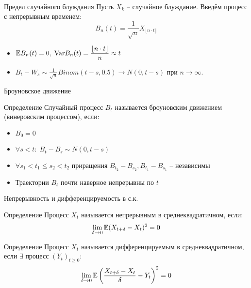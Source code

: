 \documentclass{beamer}
\begin{document}
\begin{frame}{Предел случайного блуждания}
    Пусть $X_k$ -- случайное блуждание. Введём процесс с непрерывным временем:
    $$
        B_{n}(t) = \frac{1}{\sqrt{n}} X_{\lfloor n \cdot t \rfloor}
    $$
    \begin{itemize}
        \item $\mathbb{E} B_n(t) = 0, \; \mathrm{Var} B_n(t) = \dfrac{\lfloor n \cdot t \rfloor}{n} \approx t$
        \item $B_t - W_s \sim \frac{1}{\sqrt{n}} Binom(t-s, 0.5) \to N(0, t-s)$ при $n\to\infty$.
    \end{itemize}
\end{frame}

\begin{frame}{Броуновское движение}
    \begin{block}{Определение}
        Случайный процесс $B_t$ называется броуновским движением (винеровским процессом), если:
        \begin{itemize}
            \item $B_0 = 0$
            \item $\forall s < t: \; B_t - B_s \sim N(0, t - s)$
            \item $\forall s_1 < t_1 \leq s_2 < t_2$ приращения
            $B_{t_2} - B_{s_2}, B_{t_1} - B_{s_1}$ -- независимы
            \item Траектории $B_t$ почти наверное непрерывны по $t$ 
        \end{itemize}
    \end{block}
\end{frame}
\begin{frame}{Непрерывность и дифференцируемость в с.к.}
    \begin{block}{Определение}
        Процесс $X_t$ называется непрерывным в среднеквадратичном, если:
        $$
            \lim_{\delta \to 0} \mathbb{E}(X_{t+\delta} - X_t)^2 = 0
        $$
    \end{block}
    \begin{block}{Определение}
        Процесс $X_t$ называется дифференцируемым в среднеквадратичном, если $\exists$ процесс $(Y_t)_{t\geq 0}$:
        $$
            \lim_{\delta \to 0} \mathbb{E} \left(\dfrac{X_{t+\delta} - X_t}{\delta} - Y_t\right)^2 = 0
        $$
    \end{block}
\end{frame}
\end{document}
